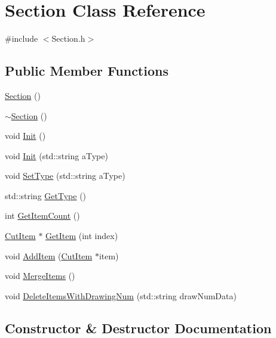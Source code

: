 \hypertarget{class_section}{}\section{Section Class Reference}
\label{class_section}


{\ttfamily \#include $<$Section.\+h$>$}

\subsection*{Public Member Functions}
\begin{DoxyCompactItemize}
\item 
\hyperlink{class_section_a77b88e06692841ba49559d22a25a09f9}{Section} ()
\item 
\hyperlink{class_section_ae2582a77c7ecb8cbd4a1b58e7ad3296e}{$\sim$\+Section} ()
\item 
void \hyperlink{class_section_acff91e218f25fc047106b0b48f6a51d0}{Init} ()
\item 
void \hyperlink{class_section_ab348355fe75d341dd805d5b4acc95512}{Init} (std\+::string a\+Type)
\item 
void \hyperlink{class_section_a121601e5ef080b2f5b6e3c7d476bcfe9}{Set\+Type} (std\+::string a\+Type)
\item 
std\+::string \hyperlink{class_section_a0b573e6163fdd4ee05c5a2f6d3ffb3a1}{Get\+Type} ()
\item 
int \hyperlink{class_section_a30cf9ff69c0fbf895db5ad58c2fcf913}{Get\+Item\+Count} ()
\item 
\hyperlink{class_cut_item}{Cut\+Item} $\ast$ \hyperlink{class_section_afff71aa78d14d30c445d71939b9bfdfb}{Get\+Item} (int index)
\item 
void \hyperlink{class_section_a8edd0089ed5ba5c1742f0c9f23ffb62a}{Add\+Item} (\hyperlink{class_cut_item}{Cut\+Item} $\ast$item)
\item 
void \hyperlink{class_section_a8329d3d2d3abdb89b121c21ea651b991}{Merge\+Items} ()
\item 
void \hyperlink{class_section_a5cffdb9ca1cb615f766f5838ce0c0655}{Delete\+Items\+With\+Drawing\+Num} (std\+::string draw\+Num\+Data)
\end{DoxyCompactItemize}


\subsection{Constructor \& Destructor Documentation}
\hypertarget{class_section_a77b88e06692841ba49559d22a25a09f9}{}
